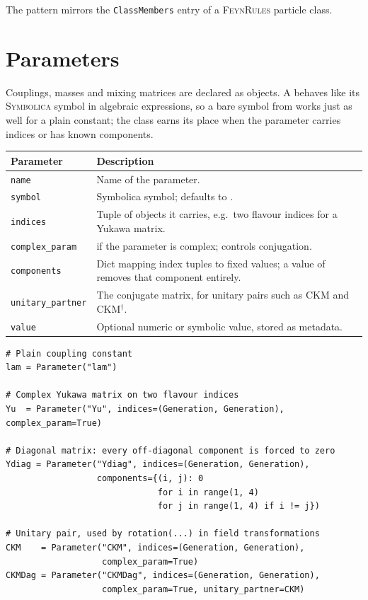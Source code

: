 \noindent The pattern mirrors the \texttt{ClassMembers} entry of a \textsc{FeynRules} particle class. 

\section{Parameters}
\label{sec:feynpy-parameters}

Couplings, masses and mixing matrices are declared as  objects. A  behaves like its \textsc{Symbolica} symbol in algebraic expressions, so a bare symbol from  works just as well for a plain constant; the class earns its place when the parameter carries indices or has known components.

\begin{center}
\begin{tabular}{@{}P{3.4cm}p{9cm}@{}}
\toprule
\normalfont\textbf{Parameter} & \textbf{Description} \\
\midrule
\texttt{name}             & Name of the parameter. \\
\texttt{symbol}           & Symbolica symbol; defaults to . \\
\texttt{indices}          & Tuple of  objects it carries, e.g.\ two flavour indices for a Yukawa matrix. \\
\texttt{complex\_param}   &  if the parameter is complex; controls conjugation. \\
\texttt{components}       & Dict mapping index tuples to fixed values; a value of  removes that component entirely. \\
\texttt{unitary\_partner} & The conjugate matrix, for unitary pairs such as CKM and CKM$^\dagger$. \\
\texttt{value}            & Optional numeric or symbolic value, stored as metadata. \\
\bottomrule
\end{tabular}
\end{center}

\begin{verbatim}
# Plain coupling constant
lam = Parameter("lam")

# Complex Yukawa matrix on two flavour indices
Yu  = Parameter("Yu", indices=(Generation, Generation), complex_param=True)

# Diagonal matrix: every off-diagonal component is forced to zero
Ydiag = Parameter("Ydiag", indices=(Generation, Generation),
                  components={(i, j): 0
                              for i in range(1, 4)
                              for j in range(1, 4) if i != j})

# Unitary pair, used by rotation(...) in field transformations
CKM    = Parameter("CKM", indices=(Generation, Generation),
                   complex_param=True)
CKMDag = Parameter("CKMDag", indices=(Generation, Generation),
                   complex_param=True, unitary_partner=CKM)
\end{verbatim}

